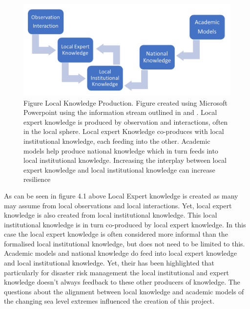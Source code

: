 \begin{figure}[h]
    \centering
    \includegraphics[width=1\textwidth]{fig_theory/local knowledge accumulation.png}
    \caption{Figure Local Knowledge Production. Figure created using Microsoft Powerpoint using the information stream outlined in \cite{setten_we_2019} and \cite{rod_integrated_2012}. Local expert knowledge is produced by observation and interactions, often in the local sphere. Local expert Knowledge co-produces with local institutional knowledge, each feeding into the other. Academic models help produce national knowledge which in turn feeds into local institutional knowledge. Increasing the interplay between local expert knowledge and local institutional knowledge can increase resilience \cite{setten_we_2019}}
    \label{fig:local_knowledge}
\end{figure}


As can be seen in figure 4.1 above Local Expert knowledge is created as many may assume from local observations and local interactions. Yet, local expert knowledge is also created from local institutional knowledge. This local institutional knowledge is in turn co-produced by local expert knowledge. In this case the local expert knowledge is often considered more informal than the formalised local institutional knowledge, but does not need to be limited to this.  Academic models and national knowledge do feed into local expert knowledge and local institutional knowledge. Yet, their has been highlighted that particularly for disaster risk management the local institutional and expert knowledge doesn't always feedback to these other producers of knowledge\cite{rod_integrated_2012}. The questions about the alignment between local knowledge and academic models of the changing sea level extremes influenced the creation of this project. 

\paragraph{}

